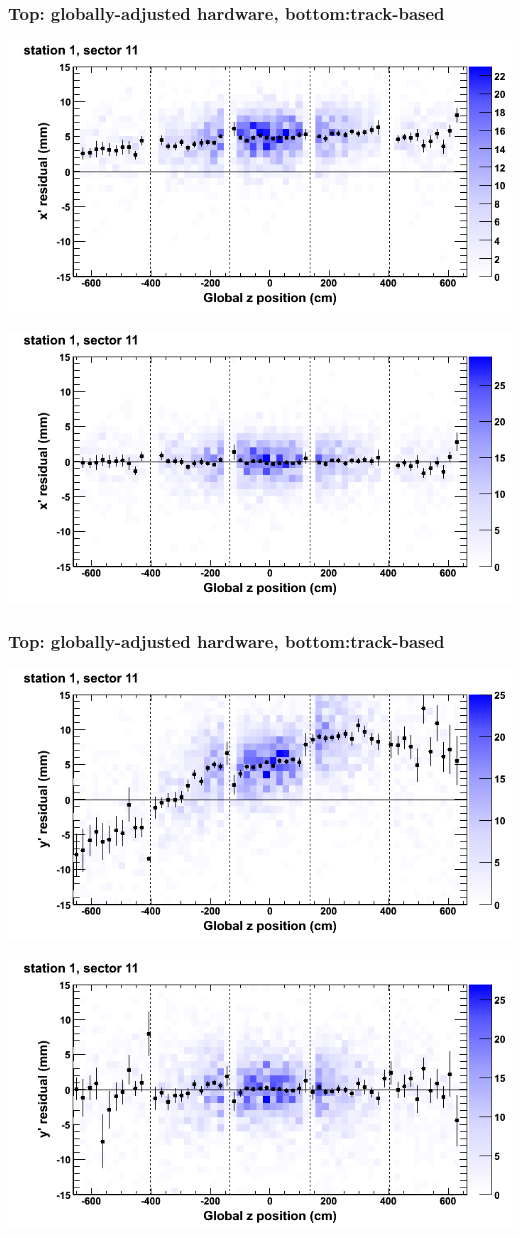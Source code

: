 \documentclass[compress]{beamer}
\begin{document}
\begin{frame}
\frametitle{Top: globally-adjusted hardware, bottom:track-based}
\includegraphics[width=0.7\linewidth]{NOV4_mapplots_HW/DTvsz_st1sec11_x.png}

\includegraphics[width=0.7\linewidth]{NOV4_mapplots/DTvsz_st1sec11_x.png}
\end{frame}

\begin{frame}
\frametitle{Top: globally-adjusted hardware, bottom:track-based}
\includegraphics[width=0.7\linewidth]{NOV4_mapplots_HW/DTvsz_st1sec11_y.png}

\includegraphics[width=0.7\linewidth]{NOV4_mapplots/DTvsz_st1sec11_y.png}
\end{frame}
\end{document}
